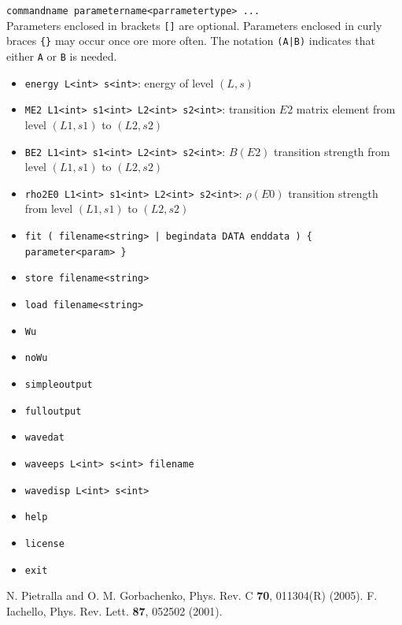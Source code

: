 \documentclass[10pt,a4paper]{article}
\begin{document}
\verb!commandname parametername<parrametertype> ...! \\
Parameters enclosed in brackets \verb![]! are optional. Parameters enclosed in curly braces \verb!{}! may occur once ore more often. The notation \verb!(A|B)! indicates that either \verb!A! or \verb!B! is needed.
\begin{itemize}
\item \verb!energy L<int> s<int>!: energy of level $(L,s)$
\item \verb!ME2 L1<int> s1<int> L2<int> s2<int>!: transition $E2$ matrix element from level $(L1,s1)$ to $(L2,s2)$
\item \verb!BE2 L1<int> s1<int> L2<int> s2<int>!: $B(E2)$ transition strength from level $(L1,s1)$ to $(L2,s2)$
\item \verb!rho2E0 L1<int> s1<int> L2<int> s2<int>!: $\rho(E0)$ transition strength from level $(L1,s1)$ to $(L2,s2)$
\item \verb!fit ( filename<string> | begindata DATA enddata ) { parameter<param> }!
\item \verb!store filename<string>!
\item \verb!load filename<string>!
\item \verb!Wu!
\item \verb!noWu!
\item \verb!simpleoutput!
\item \verb!fulloutput!
\item \verb!wavedat!
\item \verb!waveeps L<int> s<int> filename!
\item \verb!wavedisp L<int> s<int>!
\item \verb!help!
\item \verb!license!
\item \verb!exit!
\end{itemize}



\begin{thebibliography}{99}
N. Pietralla and O. M. Gorbachenko, Phys. Rev. C {\bf 70}, 011304(R) (2005).
F. Iachello, Phys. Rev. Lett. {\bf 87}, 052502 (2001).
\end{thebibliography}
\end{document}
